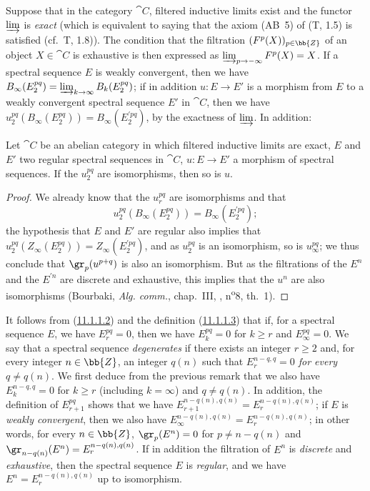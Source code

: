 \begin{env}[11.1.4]
\label{0.11.1.4}
Suppose that in the category $\cat{C}$, filtered inductive limits exist and the functor $\varinjlim$ is \emph{exact} (which is equivalent to saying that the axiom (AB~5) of (T, 1.5) is satisfied (cf.~T, 1.8)).
The condition that the filtration $(F^p(X))_{p\in\bb{Z}}$ of an object $X\in\cat{C}$ is exhaustive is then expressed as $\varinjlim_{p\to-\infty}F^p(X)=X$.
If a spectral sequence $E$ is weakly convergent, then we have $B_\infty(E_2^{pq})=\varinjlim_{k\to\infty}B_k(E_2^{pq})$; if in addition $u:E\to E'$ is a morphism from $E$ to a weakly convergent spectral sequence $E'$ in $\cat{C}$, then we have $u_2^{pq}(B_\infty(E_2^{pq}))=B_\infty(E_2^{\prime pq})$, by the exactness of $\varinjlim$.
In addition:
\end{env}

\begin{proposition}[11.1.5]
\label{0.11.1.5}
Let $\cat{C}$ be an abelian category in which filtered inductive limits are exact, $E$ and $E'$ two regular spectral sequences in $\cat{C}$, $u:E\to E'$ a morphism of spectral sequences.
If the $u_2^{pq}$ are isomorphisms, then so is $u$.
\end{proposition}

\begin{proof}
We already know  that the $u_r^{pq}$ are isomorphisms and that
\[
  u_2^{pq}(B_\infty(E_2^{pq}))=B_\infty(E_2^{\prime pq});
\]
the hypothesis that $E$ and $E'$ are regular also implies that $u_2^{pq}(Z_\infty(E_2^{pq}))=Z_\infty(E_2^{\prime pq})$, and as $u_2^{pq}$ is an isomorphism, so is $u_\infty^{pq}$; we thus conclude that $\gr_p(u^{p+q})$ is also an isomorphism.
But as the filtrations of the $E^n$ and the $E^{\prime n}$ are discrete and exhaustive, this implies that the $u^n$ are also isomorphisms (Bourbaki, \emph{Alg. comm.}, chap.~III, , n\textsuperscript{o}8, th.~1).
\end{proof}

\begin{env}[11.1.6]
\label{0.11.1.6}
It follows from (\hyperref[0.11.1.1.2]{11.1.1.2}) and the definition (\hyperref[0.11.1.1.3]{11.1.1.3}) that if, for a spectral sequence $E$, we have $E_r^{pq}=0$, then we have $E_k^{pq}=0$ for $k\geq r$ and $E_\infty^{pq}=0$.
We say that a spectral sequence \emph{degenerates} if there exists an integer $r\geq 2$ and, for every integer $n\in\bb{Z}$, an integer $q(n)$ such that \emph{$E_r^{n-q,q}=0$ for every $q\neq q(n)$}.
We first deduce from the previous remark that we also have $E_k^{n-q,q}=0$ for $k\geq r$ (including $k=\infty$) and $q\neq q(n)$.
In addition, the definition of $E_{r+1}^{pq}$ shows that we have $E_{r+1}^{n-q(n),q(n)}=E_r^{n-q(n),q(n)}$; if $E$ is \emph{weakly convergent}, then we also have $E_\infty^{n-q(n),q(n)}=E_r^{n-q(n),q(n)}$; in other words, for every $n\in\bb{Z}$, $\gr_p(E^n)=0$ for $p\neq n-q(n)$ and $\gr_{n-q(n)}(E^n)=E_r^{n-q(n),q(n)}$.
If in addition the filtration of $E^n$ is \emph{discrete} and \emph{exhaustive}, then the spectral sequence $E$ is \emph{regular}, and we have $E^n=E_r^{n-q(n),q(n)}$ up to isomorphism.
\end{env}

